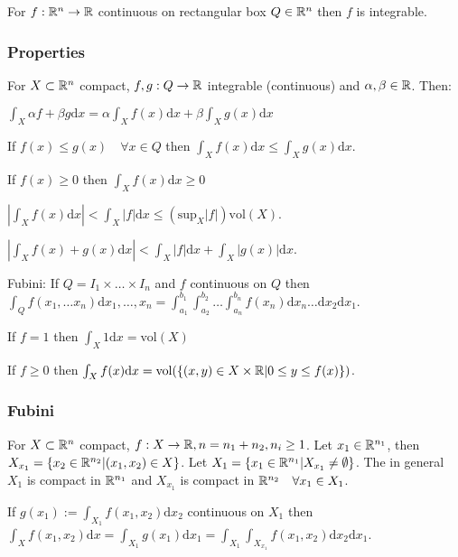 For $f: \mathbb{R}^n \to \mathbb{R}$ continuous on rectangular box $Q \in \mathbb{R}^n$ then $f$ is integrable.

\subsubsection{Properties}
For $X \subset \mathbb{R}^n$ compact, $f, g: Q \to \mathbb{R}$ integrable (continuous) and $\alpha, \beta \in \mathbb{R}$. Then:

\begin{compactitem}
    \item $\int_X \alpha f + \beta g \mathrm{d}x = \alpha \int_X f(x) \mathrm{d}x + \beta \int_X g(x) \mathrm{d}x$
    \item If $f(x) \le g(x) \quad \forall x \in Q$ then $\int_X f(x) \mathrm{d}x \le \int_X g(x) \mathrm{d}x$.
    \item If $f(x) \ge 0$ then $\int_X f(x) \mathrm{d}x \ge 0$
    \item $\left| \int_X f(x) \mathrm{d}x \right| < \int_X |f| \mathrm{d}x \le (\text{sup}_X |f|) \text{vol}(X)$.
    \item $\left| \int_X f(x) + g(x) \mathrm{d}x \right| < \int_X |f| \mathrm{d}x + \int_X | g(x) | \mathrm{d}x$.
    \item Fubini: If $Q = I_1 \times \dots \times I_n$ and $f$ continuous on $Q$ then $\int_{Q} f(x_1, \dots x_n) \mathrm{d}x_1,\dots,x_n = \int_{a_1}^{b_1} \int_{a_2}^{b_2} \dots \int_{a_n}^{b_n} f(x_n) \mathrm{d}x_n \dots \mathrm{d}x_2 \mathrm{d}x_1$.
    \item If $f = 1$ then $\int_X 1 \mathrm{d}x = \text{vol}(X)$
    \item If $f \ge 0$ then $\int_X f(x) \mathrm{d}x = \text{vol}(\{(x, y) \in X \times \mathbb{R} | 0 \le y \le f(x) \})$.
\end{compactitem}

\subsubsection{Fubini}
For $X \subset \mathbb{R}^n$ compact, $f: X \to \mathbb{R}, n = n_1 + n_2, n_i \ge 1$. Let $x_1 \in \mathbb{R}^{n_1}$, then $X_{x_1} = \{x_2 \in \mathbb{R}^{n_2} | (x_1, x_2) \in X\}$. Let $X_1 = \{x_1 \in \mathbb{R}^{n_1} | X_{x_1} \neq \emptyset \}$. The in general $X_1$ is compact in $\mathbb{R}^{n_1}$ and $X_{x_1}$ is compact in $\mathbb{R}^{n_2} \quad \forall x_1 \in X_1$.

If $g(x_1) := \int_{X_1} f(x_1, x_2) \mathrm{d}x_2$ continuous on $X_1$ then $\int_X f(x_1, x_2) \mathrm{d}x = \int_{X_1} g(x_1) \mathrm{d}x_1 = \int_{X_1} \int_{X_{x_1}} f(x_1, x_2) \mathrm{d}x_2 \mathrm{d}x_1$.

